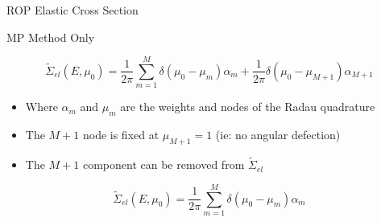 \documentclass{beamer}
\begin{document}

\begin{frame}{ROP Elastic Cross Section}

\begin{block}{MP Method Only}

\begin{equation}
	\tilde{\Sigma}_{el}(E,\mu_0) 
	= \frac{1}{2\pi}\sum_{m=1}^{M} \delta(\mu_0-\mu_m)\alpha_m
	 +\frac{1}{2\pi} \delta(\mu_0-\mu_{M+1})\alpha_{M+1}
\end{equation}
	
  \begin{itemize}
    \item Where  $\alpha_m$ and  $\mu_m$ are the weights and nodes of the Radau quadrature
    \item The $M+1$ node is fixed at $\mu_{M+1}=1$ (ie: no angular defection)
    \item The $M+1$ component can be removed from $\tilde{\Sigma}_{el}$
  \end{itemize}
  
  \begin{equation}
	\tilde{\Sigma}_{el}(E,\mu_0) 
	= \frac{1}{2\pi}\sum_{m=1}^{M} \delta(\mu_0-\mu_m)\alpha_m
\end{equation}

\end{block}

\end{frame}

\end{document}
